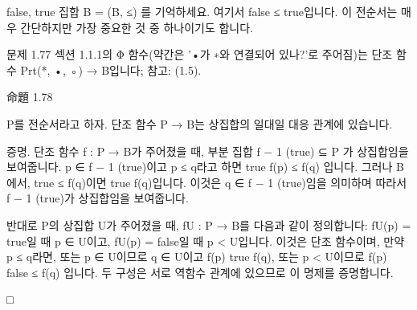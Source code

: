 \documentclass[11pt, a4paper, twoside, openany]{book}
\begin{document}
\par\medskip
{false, true} 집합 B = (B, ≤) 를 기억하세요. 여기서 false ≤ true\hspace{0pt}입니다. 이 전순서는 매우 간단하지만 가장 중요한 것 중 하나이기도 합니다.

\par\medskip
문제 1.77
섹션 1.1.1\hspace{0pt}의 Φ 함수(약간은 '•가 ∗와 연결되어 있나?'로 주어짐)는 단조 함수 Prt({*, •, ◦}) → B\hspace{0pt}입니다; 참고: (1.5).

\par\medskip
命題 1.78

\par\medskip
P\hspace{0pt}를 전순서라고 하자.
단조 함수 P → B\hspace{0pt}는 상집합의 일대일 대응 관계에 있습니다.

\par\medskip
증명. 단조 함수 f : P → B\hspace{0pt}가 주어졌을 때, 부분 집합 f − 1 (true) ⊆ P 가 상집합임을 보여줍니다. p ∈ f − 1 (true)이고 p ≤ q\hspace{0pt}라고 하면 true  f(p) ≤ f(q) 입니다. 그러나 B\hspace{0pt}에서, true ≤ f(q)이면 true  f(q)입니다. 이것은 q ∈ f − 1 (true)임을 의미하며 따라서 f − 1 (true)가 상집합임을 보여줍니다.

\par\medskip
반대로 P\hspace{0pt}의 상집합 U\hspace{0pt}가 주어졌을 때, fU : P → B\hspace{0pt}를 다음과 같이 정의합니다: fU(p) = true\hspace{0pt}일 때 p ∈ U\hspace{0pt}이고, fU(p) = false\hspace{0pt}일 때 p < U\hspace{0pt}입니다. 이것은 단조 함수이며, 만약 p ≤ q\hspace{0pt}라면, 또는 p ∈ U\hspace{0pt}이므로 q ∈ U\hspace{0pt}이고 f(p)  true  f(q), 또는 p < U\hspace{0pt}이므로 f(p)  false ≤ f(q) 입니다. 두 구성은 서로 역함수 관계에 있으므로 이 명제를 증명합니다.

\par\medskip
□
\end{document}
